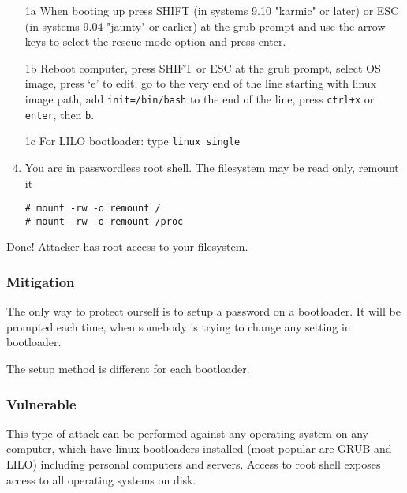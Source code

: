 \begin{enumerate}
    \item[1a] When booting up press SHIFT (in systems 9.10 "karmic" or later) or ESC (in systems 9.04 "jaunty" or earlier) at the grub prompt and use the arrow keys to select the rescue mode option and press enter. 

    \item[1b] Reboot computer, press SHIFT or ESC at the grub prompt, select OS image, press `e' to edit, go to the very end of the line starting with linux image path, add \texttt{init=/bin/bash} to the end of the line, press \texttt{ctrl+x} or \texttt{enter}, then \texttt{b}.

    \item[1c] For LILO bootloader: type \verb|linux single|

    \item You are in passwordless root shell. The filesystem may be read only, remount it

\begin{lstlisting}
# mount -rw -o remount /
# mount -rw -o remount /proc
\end{lstlisting}

\end{enumerate}

Done! Attacker has root access to your filesystem.


\subsubsection*{Mitigation}
The only way to protect ourself is to setup a password on a bootloader. It will be prompted each time, when somebody is trying to change any setting in bootloader. 

The setup method is different for each bootloader.

\subsubsection*{Vulnerable}
This type of attack can be performed against any operating system on any computer, which have linux bootloaders installed (most popular are GRUB and LILO) including personal computers and servers. Access to root shell exposes access to all operating systems on disk.

